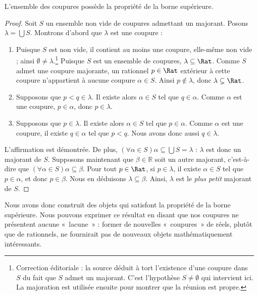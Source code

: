 \documentclass[11pt,a4paper,openany]{memoir}
\begin{document}
\begin{thm}
L'ensemble des coupures possède la propriété de la borne supérieure.
\end{thm}

\begin{proof}
Soit $S$ un ensemble non vide de coupures admettant un majorant. Posons
$\lambda = \bigcup S$.
Montrons d'abord que $\lambda$ est une coupure :
\begin{enumerate}
\item Puisque $S$ est non vide, il contient au moins une coupure, elle-même
non vide ; ainsi $\emptyset \neq \lambda$.\footnote{Correction éditoriale : la source déduit à tort l'existence d'une coupure dans $S$ du fait que $S$ admet un majorant. C'est l'hypothèse $S\neq\emptyset$ qui intervient ici. La majoration est utilisée ensuite pour montrer que la réunion est propre.}
Puisque $S$ est un ensemble de coupures, $\lambda \subseteq \Rat$.
Comme $S$ admet une coupure majorante, un rationnel $p \in \Rat$
extérieur à cette coupure n'appartient à aucune coupure $\alpha \in S$.
Ainsi $p\notin \lambda$, donc $\lambda \subsetneq \Rat$.
\item Supposons que $p < q \in \lambda$. Il existe alors $\alpha \in S$
tel que $q \in \alpha$. Comme $\alpha$ est une coupure, $p \in \alpha$,
donc $p \in \lambda$.
\item Supposons que $p \in \lambda$. Il existe alors $\alpha \in S$
tel que $p \in \alpha$. Comme $\alpha$ est une coupure, il existe
$q \in \alpha$ tel que $p < q$. Nous avons donc aussi $q \in \lambda$.
\end{enumerate}
L'affirmation est démontrée. De plus,
$(\forall \alpha \in S)\alpha \subseteq \bigcup S = \lambda$ :
$\lambda$ est donc un majorant de $S$. Supposons maintenant que
$\beta \in \mathbb{R}$ soit un autre majorant, c'est-à-dire que
$(\forall \alpha \in S)\alpha \subseteq \beta$. Pour tout $p \in \Rat$,
si $p \in \lambda$, il existe $\alpha \in S$ tel que $p \in \alpha$,
et donc $p \in \beta$. Nous en déduisons $\lambda \subseteq \beta$.
Ainsi, $\lambda$ est le \emph{plus petit} majorant de $S$.
\end{proof}

Nous avons donc construit des objets qui satisfont la propriété de la
borne supérieure. Nous pouvons exprimer ce résultat en disant que nos
coupures ne présentent aucune «~lacune~» : former de nouvelles
«~coupures~» de réels, plutôt que de rationnels, ne fournirait pas
de nouveaux objets mathématiquement intéressants.
\end{document}
